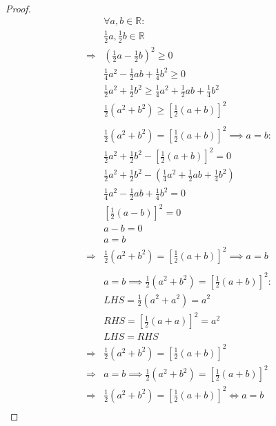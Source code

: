 \documentclass{article}
\begin{document}
~

\begin{proof}
    \begin{align*}
        &\forall a,b\in \mathbb{R}:\\
        &\frac{1}{2}a,\frac{1}{2}b\in\mathbb{R} \\
        \Rightarrow&(\frac{1}{2}a-\frac{1}{2}b)^2\geqslant 0\\
        &\frac{1}{4}a^2-\frac{1}{2}ab+\frac{1}{4}b^2\geqslant0\\
        &\frac{1}{2}a^2+\frac{1}{2}b^2\geqslant \frac{1}{4}a^2+\frac{1}{2}ab+\frac{1}{4}b^2\\
        &\frac{1}{2}(a^2+b^2)\geqslant [\frac{1}{2}(a+b)]^2\\
        &\\
        &\frac{1}{2}(a^2+b^2)= [\frac{1}{2}(a+b)]^2\implies a=b:\\
        &\frac{1}{2}a^2+\frac{1}{2}b^2-[\frac{1}{2}(a+b)]^2=0\\
        &\frac{1}{2}a^2+\frac{1}{2}b^2-(\frac{1}{4}a^2+\frac{1}{2}ab+\frac{1}{4}b^2)\\
        &\frac{1}{4}a^2-\frac{1}{2}ab+\frac{1}{4}b^2=0\\
        &[\frac{1}{2}(a-b)]^2=0\\
        &a-b=0\\
        &a=b\\
        \Rightarrow&\frac{1}{2}(a^2+b^2)= [\frac{1}{2}(a+b)]^2\implies a=b\\
        &\\
        &a=b\implies \frac{1}{2}(a^2+b^2)= [\frac{1}{2}(a+b)]^2:\\
        &LHS=\frac{1}{2}(a^2+a^2)=a^2\\
        &RHS=[\frac{1}{2}(a+a)]^2=a^2\\
        &LHS=RHS\\
        \Rightarrow&\frac{1}{2}(a^2+b^2)= [\frac{1}{2}(a+b)]^2\\
        \Rightarrow&a=b\implies \frac{1}{2}(a^2+b^2)= [\frac{1}{2}(a+b)]^2\\
        \Rightarrow&\frac{1}{2}(a^2+b^2)= [\frac{1}{2}(a+b)]^2\Leftrightarrow a=b\\
    \end{align*}
\end{proof}
\end{document}
